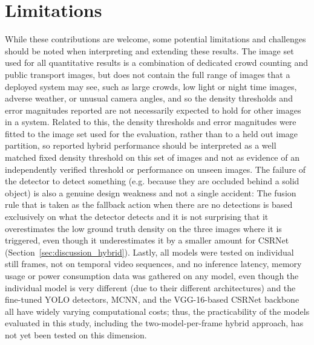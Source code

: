 \section{Limitations}
\label{sec:conclusion_limitations}
While these contributions are welcome, some potential limitations and challenges should be noted when interpreting and extending these results. The image set used for all quantitative results is a combination of dedicated crowd counting and public transport images, but does not contain the full range of images that a deployed system may see, such as large crowds, low light or night time images, adverse weather, or unusual camera angles, and so the density thresholds and error magnitudes reported are not necessarily expected to hold for other images in a system. Related to this, the density thresholds and error magnitudes were fitted to the image set used for the evaluation, rather than to a held out image partition, so reported hybrid performance should be interpreted as a well matched fixed density threshold on this set of images and not as evidence of an independently verified threshold or performance on unseen images. The failure of the detector to detect something (e.g. because they are occluded behind a solid object) is also a genuine design weakness and not a single accident: The fusion rule that is taken as the fallback action when there are no detections is based exclusively on what the detector detects and it is not surprising that it overestimates the low ground truth density on the three images where it is triggered, even though it underestimates it by a smaller amount for CSRNet (Section~\ref{sec:discussion_hybrid}). Lastly, all models were tested on individual still frames, not on temporal video sequences, and no inference latency, memory usage or power consumption data was gathered on any model, even though the individual model is very different (due to their different architectures) and the fine-tuned YOLO detectors, MCNN, and the VGG-16-based CSRNet backbone all have widely varying computational costs; thus, the practicability of the models evaluated in this study, including the two-model-per-frame hybrid approach, has not yet been tested on this dimension.

